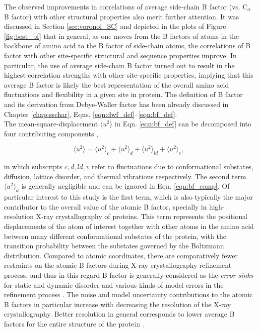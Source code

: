 \documentclass[11pt]{article}
\begin{document}
    The observed improvements in correlations of average side-chain B factor (vs. C$_\alpha$ B factor) with other structural properties also merit further attention. It was discussed in Section \ref{sec:voronoi_SC} and depicted in the plots of Figure \ref{fig:best_bf} that in general, as one moves from the B factors of atoms in the backbone of amino acid to the B factor of side-chain atoms, the correlations of B factor with other site-specific structural and sequence properties improve. In particular, the use of average side-chain B factor turned out to result in the highest correlation strengths with other site-specific properties, implying that this average B factor is likely the best representation of the overall amino acid fluctuations and flexibility in a given site in protein.  The definition of B factor and its derivation from Debye-Waller factor has been already discussed in Chapter \ref{chap:sschar}, Eqns. \ref{eqn:dwf_def}--\ref{eqn:bf_def}. \\

    The mean-square-displacement $\langle u^2 \rangle$ in Eqn. \ref{eqn:bf_def} can be decomposed into four contributing components \cite{frauenfelder_temperature-dependent_1979},

    \begin{equation}
        \label{eqn:bf_comp}
        \langle u^2 \rangle = \langle u^2 \rangle_c + \langle u^2 \rangle_d + \langle u^2 \rangle_{ld} + \langle u^2 \rangle_v,
    \end {equation}

    \noindent in which subscripts $c, d, ld, v$ refer to fluctuations due to conformational substates, diffusion, lattice disorder, and thermal vibrations respectively. The second term $\langle u^2 \rangle_d$ is generally negligible and can be ignored in Eqn. \ref{eqn:bf_comp}. Of particular interest to this study is the first term, which is also typically the major contributor to the overall value of the atomic B factor, specially in high-resolution X-ray crystallography of proteins. This term represents the positional displacements of the atom of interest together with other atoms in the amino acid between many different conformational substates of the protein, with the transition probability between the substates governed by the Boltzmann distribution. Compared to atomic coordinates, there are comparatively fewer restraints on the atomic B factors during X-ray crystallography refinement process, and thus in this regard B factor is generally considered as the {\it error sinks} for static and dynamic disorder and various kinds of model errors in the refinement process \cite{read_structure-factor_1990}. The noise and model uncertainty contributions to the atomic B factors in particular increase with decreasing the resolution of the X-ray crystallography. Better resolution in general corresponds to lower average B factors for the entire structure of the protein \cite{read_structure-factor_1990}. \\
\end{document}
